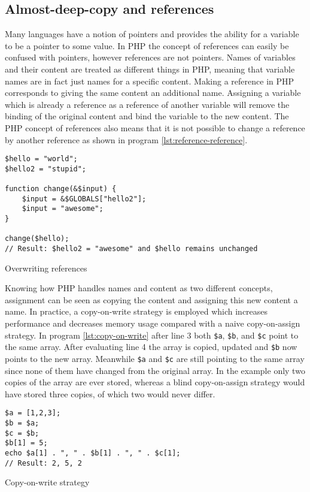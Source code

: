\subsection{Almost-deep-copy and references}
\label{sec:backg_references}
Many languages have a notion of pointers and provides the ability for a variable to be a pointer to some value. In PHP the concept of references can easily be confused with pointers, however references are not pointers. Names of variables and their content are treated as different things in PHP, meaning that variable names are in fact just names for a specific content. Making a reference in PHP corresponds to giving the same content an additional name. Assigning a variable which is already a reference as a reference of another variable will remove the binding of the original content and bind the variable to the new content. The PHP concept of references also means that it is not possible to change a reference by another reference as shown in program \ref{lst:reference-reference}.

\begin{program}
\begin{lstlisting}
$hello = "world";
$hello2 = "stupid";

function change(&$input) {
    $input = &$GLOBALS["hello2"];
    $input = "awesome";
}

change($hello);
// Result: $hello2 = "awesome" and $hello remains unchanged
\end{lstlisting}
\caption{Overwriting references}
\label{lst:reference-reference}
\end{program}

Knowing how PHP handles names and content as two different concepts, assignment can be seen as copying the content and assigning this new content a name. In practice, a copy-on-write strategy is employed which increases performance and decreases memory usage compared with a naive copy-on-assign strategy. In program \ref{lst:copy-on-write} after line 3 both \texttt{\$a}, \texttt{\$b}, and \texttt{\$c} point to the same array. After evaluating line 4 the array is copied, updated and \texttt{\$b} now points to the new array. Meanwhile \texttt{\$a} and \texttt{\$c} are still pointing to the same array since none of them have changed from the original array. In the example only two copies of the array are ever stored, whereas a blind copy-on-assign strategy would have stored three copies, of which two would never differ.

\begin{program}
\begin{lstlisting}
$a = [1,2,3];
$b = $a;
$c = $b;
$b[1] = 5;
echo $a[1] . ", " . $b[1] . ", " . $c[1];
// Result: 2, 5, 2
\end{lstlisting}
\caption{Copy-on-write strategy}
\label{lst:copy-on-write}
\end{program}

